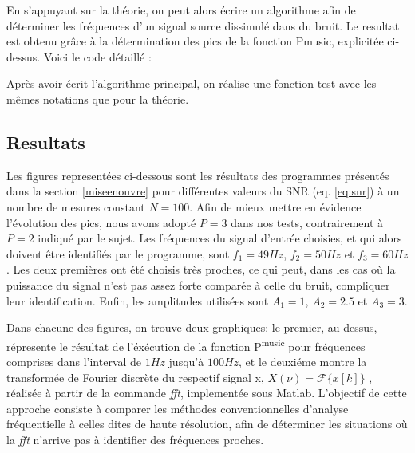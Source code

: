 \documentclass{article}
\begin{document}
\vspace*{10pt}

En s'appuyant sur la théorie, on peut alors écrire un algorithme afin de déterminer les fréquences d'un signal source dissimulé dans du bruit. Le resultat est obtenu grâce à la détermination des pics de la fonction Pmusic, explicitée ci-dessus. 
Voici le code détaillé :

\vspace*{20pt}



\newpage

Après avoir écrit l'algorithme principal, on réalise une fonction test avec les mêmes notations que pour la théorie.

\vspace*{20pt}



\subsection{Resultats}

Les figures representées ci-dessous sont les résultats des programmes présentés dans la section \ref{miseenouvre} pour différentes valeurs du SNR (eq. \ref{eq:snr}) à un  nombre de mesures constant \(N = 100\). Afin de mieux mettre en évidence l'évolution des pics, nous avons adopté \(P = 3\) dans nos tests, contrairement à \( P = 2\) indiqué par le sujet. Les fréquences du signal d'entrée choisies, et qui alors doivent être identifiés par le programme, sont  \(f_1 = 49Hz\), \(f_2 = 50Hz\) et \(f_3 = 60Hz\).  Les deux premières ont été choisis très proches, ce qui peut, dans les cas où la puissance du signal n'est pas assez forte comparée à celle du bruit, compliquer leur identification. Enfin, les amplitudes utilisées sont \(A_1 = 1\), \(A_2 = 2.5\) et \(A_3 = 3\).

\vspace*{10pt}

Dans chacune des figures, on trouve deux graphiques: le premier, au dessus, répresente le résultat de l'éxécution de la fonction P\textsuperscript{music} pour fréquences comprises dans l'interval de \(1 Hz\) jusqu'à \(100Hz\), et le deuxiéme montre la transformée de Fourier discrète du respectif signal x, \(X( \nu ) = \mathcal{F} \{x[k]\}\) ,  réalisée à partir de la commande \textit{fft}, implementée sous Matlab. L'objectif de cette approche consiste à comparer les méthodes conventionnelles d'analyse fréquentielle à celles dites de haute résolution, afin de déterminer les situations où la \textit{fft} n'arrive pas à identifier des fréquences proches. 
\end{document}
